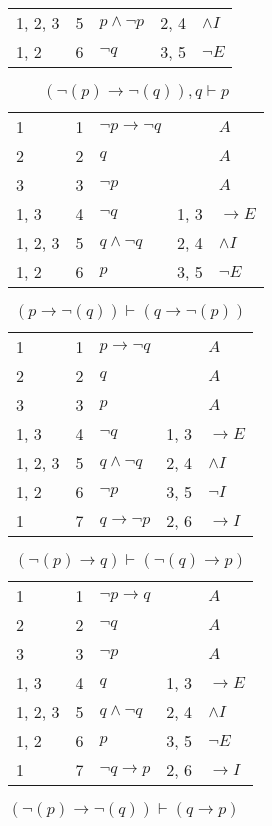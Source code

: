 \documentclass{article}
\begin{document}
\begin{table}[htbp]
\begin{tabular}{lrlll}
{1, 2, 3} & 5 & $p∧ ¬p$ & {2, 4} & $∧I$ \\
{1, 2} & 6 & $¬q$ & {3, 5} & $¬E$ \\
\end{tabular}
\end{table}\begin{table}[htbp]\caption*{$(¬(p) → ¬(q)),q ⊢ p$}\centering\begin{tabular}{lrlll}
{1} & 1 & $¬p→ ¬q$ & {} & $A$ \\
{2} & 2 & $q$ & {} & $A$ \\
{3} & 3 & $¬p$ & {} & $A$ \\
{1, 3} & 4 & $¬q$ & {1, 3} & $→E$ \\
{1, 2, 3} & 5 & $q∧ ¬q$ & {2, 4} & $∧I$ \\
{1, 2} & 6 & $p$ & {3, 5} & $¬E$ \\
\end{tabular}
\end{table}\begin{table}[htbp]\caption*{$(p → ¬(q)) ⊢ (q → ¬(p))$}\centering\begin{tabular}{lrlll}
{1} & 1 & $p→ ¬q$ & {} & $A$ \\
{2} & 2 & $q$ & {} & $A$ \\
{3} & 3 & $p$ & {} & $A$ \\
{1, 3} & 4 & $¬q$ & {1, 3} & $→E$ \\
{1, 2, 3} & 5 & $q∧ ¬q$ & {2, 4} & $∧I$ \\
{1, 2} & 6 & $¬p$ & {3, 5} & $¬I$ \\
{1} & 7 & $q→ ¬p$ & {2, 6} & $→I$ \\
\end{tabular}
\end{table}\begin{table}[htbp]\caption*{$(¬(p) → q) ⊢ (¬(q) → p)$}\centering\begin{tabular}{lrlll}
{1} & 1 & $¬p→q$ & {} & $A$ \\
{2} & 2 & $¬q$ & {} & $A$ \\
{3} & 3 & $¬p$ & {} & $A$ \\
{1, 3} & 4 & $q$ & {1, 3} & $→E$ \\
{1, 2, 3} & 5 & $q∧ ¬q$ & {2, 4} & $∧I$ \\
{1, 2} & 6 & $p$ & {3, 5} & $¬E$ \\
{1} & 7 & $¬q→p$ & {2, 6} & $→I$ \\
\end{tabular}
\end{table}\begin{table}[htbp]\caption*{$(¬(p) → ¬(q)) ⊢ (q → p)$}\centering\begin{tabular}{lrlll}

\end{tabular}
\end{table}
\end{document}
